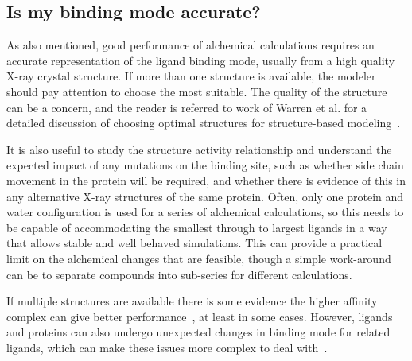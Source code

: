 \documentclass[9pt,bestpractices]{livecoms}
\begin{document}
\subsection{Is my binding mode accurate?}
As also mentioned, good performance of alchemical calculations requires an accurate representation of the ligand binding mode, usually from a high quality X-ray crystal structure. If more than one structure is available, the modeler should pay attention to choose the most suitable. The quality of the structure can be a concern, and the reader is referred to work of Warren et al. for a detailed discussion of choosing optimal structures for structure-based modeling~\cite{warren2012essential}.

It is also useful to study the structure activity relationship and understand the expected impact of any mutations on the binding site, such as whether side chain movement in the protein will be required, and whether there is evidence of this in any alternative X-ray structures of the same protein. Often, only one protein and water configuration is used for a series of alchemical calculations, so this needs to be capable of accommodating the smallest through to largest ligands in a way that allows stable and well behaved simulations. This can provide a practical limit on the alchemical changes that are feasible, though a simple work-around can be to separate compounds into sub-series for different calculations. 

If multiple structures are available there is some evidence the higher affinity complex can give better performance~\cite{perez-benito2019predicting}, at least in some cases. However, ligands and proteins can also undergo unexpected changes in binding mode for related ligands, which can make these issues more complex to deal with~\cite{mey2016blinded}.
\end{document}

